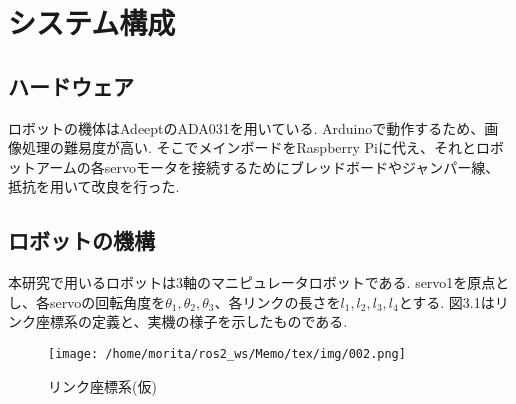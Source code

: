 \chapter{システム構成}
  \label{chap:system}
  \section{ハードウェア}
  	\label{chap:hardware}
 	ロボットの機体はAdeeptのADA031を用いている. Arduinoで動作するため、画像処理の難易度が高い. そこでメインボードをRaspberry Piに代え、それとロボットアームの各servoモータを接続するためにブレッドボードやジャンパー線、抵抗を用いて改良を行った.
  \section{ロボットの機構}
  	\label{chap:mechanism}
	本研究で用いるロボットは3軸のマニピュレータロボットである. servo1を原点とし、各servoの回転角度を$\theta_1, \theta_2, \theta_3$、各リンクの長さを$l_1, l_2, l_3, l_4$とする. 図3.1はリンク座標系の定義と、実機の様子を示したものである.
		 \begin{center}
        \begin{figure}[h]
            \texttt{[image: /home/morita/ros2\_ws/Memo/tex/img/002.png]}
            \caption{リンク座標系(仮)}
            \label{test}
        \end{figure}
    \end{center}

